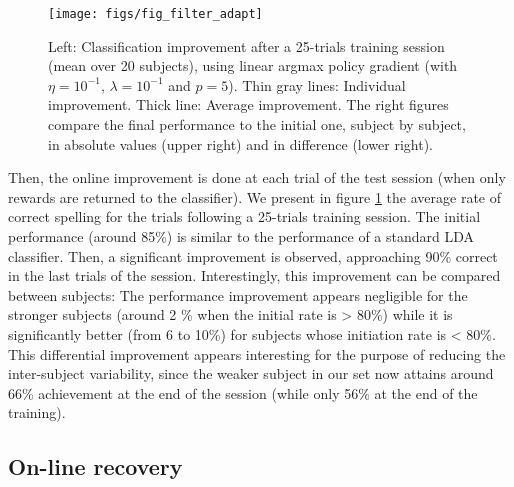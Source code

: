 \documentclass[conference]{IEEEtran}
\begin{document}
\begin{figure}
\centerline{
 \texttt{[image: figs/fig\_filter\_adapt]}
}
\caption{Left: Classification improvement after a 25-trials training session (mean over 20 subjects), 
using linear argmax policy gradient (with $\eta = 10^{-1}$, $\lambda = 10^{-1}$ and $p=5$). 
Thin gray lines: Individual improvement. Thick line: Average improvement. The right figures compare the 
final performance to the initial one, subject by subject, in absolute values (upper right) and in
difference (lower right).}
\label{fig:filter_adapt}
\end{figure}

Then, the online improvement
is done at each trial of the test session (when only rewards are returned to the classifier).
We present in figure \ref{fig:filter_adapt} the average rate of correct spelling for the trials
following a 25-trials training session. The initial performance (around 85\%) is similar to 
the performance of a standard LDA classifier. Then, a significant improvement is observed, approaching
90\% correct in the last trials of the session.
Interestingly, this improvement can be compared between subjects: The performance improvement
appears negligible for the stronger subjects (around 2 \% when the initial rate is > 80\%) while it
is significantly better (from 6 to 10\%) for subjects whose initiation rate is < 80\%. 
This differential improvement appears interesting for the purpose of reducing the inter-subject
variability, since the weaker subject in our set now attains around 66\% achievement at the end of the session
(while only 56\% at the end of the training). 


\subsection{On-line recovery} \label{sec:sp_filt_rec}
\end{document}
